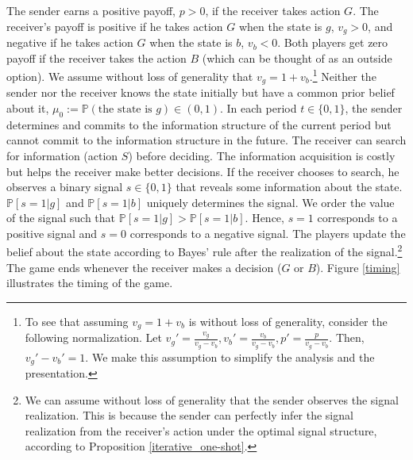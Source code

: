 \documentclass[11pt]{extarticle}
\begin{document}
The sender earns a positive payoff, $p > 0$, if the receiver takes action $G$. The receiver's payoff is positive if he takes action $G$ when the state is $g$, $v_g > 0$, and negative if he takes action $G$ when the state is $b$, $v_b < 0$. Both players get zero payoff if the receiver takes the action $B$ (which can be thought of as an outside option). We assume without loss of generality that $v_g = 1+v_b$.\footnote{To see that assuming $v_g = 1+v_b$ is without loss of generality, consider the following normalization. Let $v_g' = \frac{v_g}{v_g - v_b}, v_b' = \frac{v_b}{v_g - v_b}, p' = \frac{p}{v_g - v_b}$. Then, $v_g' - v_b' = 1$. We make this assumption to simplify the analysis and the presentation.} Neither the sender nor the receiver knows the state initially but have a common prior belief about it, $\mu_0 := \mathbb{P}(\text{the state is }g) \in (0,1)$. In each period $t \in \{0,1\}$, the sender determines and commits to the information structure of the current period but cannot commit to the information structure in the future. The receiver can search for information (action $S$) before deciding. The information acquisition is costly but helps the receiver make better decisions. If the receiver chooses to search, he observes a binary signal $s \in \{0,1\}$ that reveals some information about the state. %
$\mathbb{P}[s=1\vert g]$ and $\mathbb{P}[s=1\vert b]$ uniquely determines the signal. We order the value of the signal such that $\mathbb{P}[s=1\vert g] > \mathbb{P}[s=1\vert b]$. Hence, $s = 1$ corresponds to a positive signal and $s=0$ corresponds to a negative signal. The players update the belief about the state according to Bayes' rule after the realization of the signal.\footnote{We can assume without loss of generality that the sender observes the signal realization. This is because the sender can perfectly infer the signal realization from the receiver's action under the optimal signal structure, according to Proposition \ref{iterative_one-shot}.} The game ends whenever the receiver makes a decision ($G$ or $B$). Figure \ref{timing} illustrates the timing of the game.
\end{document}
